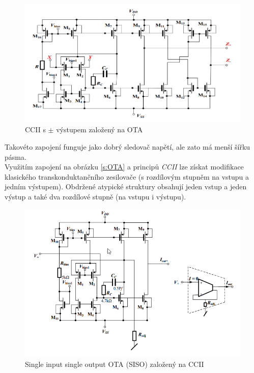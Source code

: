 \begin{figure}[h]
\centering
\includegraphics[scale=0.45]{cciiota.png}
\caption[CCII s $\pm$ výstupem založený na OTA]{CCII s $\pm$ výstupem založený na OTA \cite{8}}
\end{figure}
\noindent Takovéto zapojení funguje jako dobrý sledovač napětí, ale zato má menší šířku pásma.\\
\newline
Využitím zapojení na obrázku \ref{s:OTA} a principů \textit{CCII} lze získat modifikace klasického transkonduktančního zesilovače (s rozdílovým stupněm na vstupu a jedním výstupem). Obdržené atypické struktury obsahují jeden vstup a jeden výstup a také dva rozdílové stupně (na vstupu i výstupu).
\begin{figure}[h]
\centering
\includegraphics[scale=0.6]{siso.png}
\caption[Single input single output OTA (SISO) založený na CCII]{Single input single output OTA (SISO) založený na CCII \cite{8}}
\end{figure}

